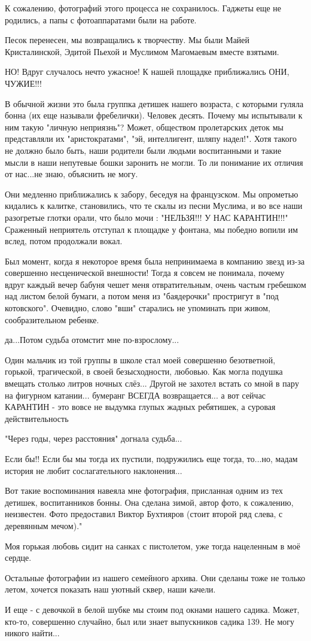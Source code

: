 К сожалению,  фотографий этого процесса не сохранилось. Гаджеты еще не
родились, а папы с фотоаппаратами были на работе.

Песок перенесен, мы возвращались к творчеству. Мы были Майей Кристалинской,
Эдитой Пьехой и Муслимом Магомаевым вместе взятыми.

НО! Вдруг случалось нечто ужасное! К нашей площадке приближались ОНИ, ЧУЖИЕ!!!

В обычной жизни это была группка детишек нашего возраста, с которыми гуляла
бонна (их еще называли фребелички). Человек десять. Почему мы испытывали к ним
такую "личную неприязнь"? Может, обществом пролетарских деток мы представляли
их "аристократами",  "эй, интеллигент, шляпу надел!". Хотя такого не должно
было быть, наши родители были людьми воспитанными и такие мысли в наши
непутевые бошки заронить не могли. То ли понимание их отличия от нас...не знаю,
объяснить не могу.

Они медленно приближались к забору, беседуя на французском. Мы опрометью
кидались к калитке, становились, что те скалы из песни Муслима, и во все наши
разогретые глотки орали, что было мочи : "НЕЛЬЗЯ!!! У НАС КАРАНТИН!!!"
Сраженный неприятель отступал к площадке у фонтана, мы победно вопили им вслед,
потом продолжали вокал.

Был момент, когда я некоторое время была непринимаема в компанию звезд из-за
совершенно несценической внешности! Тогда я совсем не понимала, почему вдруг
каждый вечер бабуня чешет меня отвратительным, очень частым гребешком над
листом белой бумаги, а потом меня из "баядерочки" простригут в "под
котовского". Очевидно, слово "вши" старались не упоминать при живом,
сообразительном ребенке.

да...Потом судьба отомстит мне по-взрослому...

Один мальчик из той группы в школе стал моей совершенно безответной, горькой,
трагической, в своей безысходности, любовью. Как могла подушка вмещать столько
литров ночных слёз... Другой не захотел встать со мной в пару на фигурном
катании... бумеранг ВСЕГДА возвращается... а вот сейчас КАРАНТИН - это вовсе не
выдумка глупых жадных ребятишек, а суровая действительность

"Через годы, через расстояния" догнала судьба...

Если бы!! Если бы мы тогда их пустили, подружились еще тогда, то...но, мадам
история не любит сослагательного наклонения...

Вот такие воспоминания навеяла мне фотография, присланная одним из тех детишек,
воспитанников бонны. Она сделана зимой, автор фото, к сожалению, неизвестен.
Фото предоставил Виктор Бухтияров (стоит второй ряд слева, с деревянным
мечом)."

Моя горькая любовь сидит на санках с пистолетом, уже тогда нацеленным в моё
сердце.

Остальные фотографии из нашего семейного архива. Они сделаны тоже не только
летом, хочется показать наш уютный сквер, наши качели.

И еще - с девочкой в белой шубке мы стоим под окнами нашего садика. Может,
кто-то, совершенно случайно, был или знает выпускников садика 139. Не могу
никого найти...
